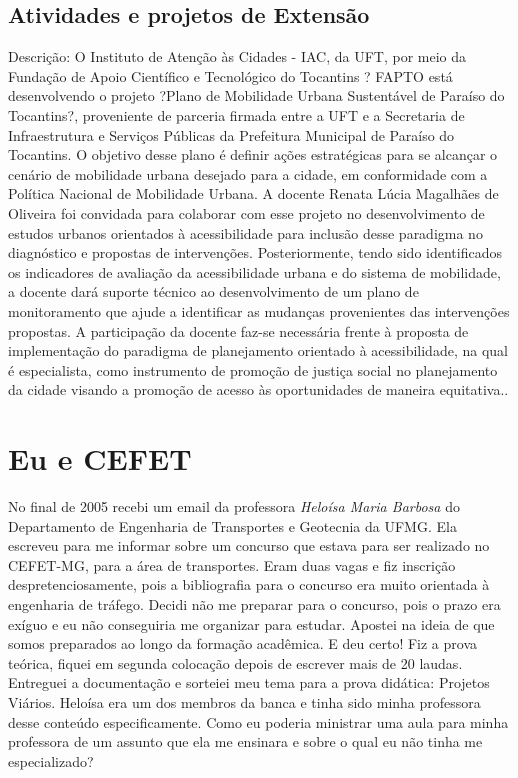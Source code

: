 \documentclass[
]{book}
\begin{document}
\hypertarget{atividades-e-projetos-de-extensuxe3o}{%
\section{Atividades e projetos de
Extensão}\label{atividades-e-projetos-de-extensuxe3o}}

Descrição: O Instituto de Atenção às Cidades - IAC, da UFT, por meio da
Fundação de Apoio Científico e Tecnológico do Tocantins ? FAPTO está
desenvolvendo o projeto ?Plano de Mobilidade Urbana Sustentável de
Paraíso do Tocantins?, proveniente de parceria firmada entre a UFT e a
Secretaria de Infraestrutura e Serviços Públicas da Prefeitura Municipal
de Paraíso do Tocantins. O objetivo desse plano é definir ações
estratégicas para se alcançar o cenário de mobilidade urbana desejado
para a cidade, em conformidade com a Política Nacional de Mobilidade
Urbana. A docente Renata Lúcia Magalhães de Oliveira foi convidada para
colaborar com esse projeto no desenvolvimento de estudos urbanos
orientados à acessibilidade para inclusão desse paradigma no diagnóstico
e propostas de intervenções. Posteriormente, tendo sido identificados os
indicadores de avaliação da acessibilidade urbana e do sistema de
mobilidade, a docente dará suporte técnico ao desenvolvimento de um
plano de monitoramento que ajude a identificar as mudanças provenientes
das intervenções propostas. A participação da docente faz-se necessária
frente à proposta de implementação do paradigma de planejamento
orientado à acessibilidade, na qual é especialista, como instrumento de
promoção de justiça social no planejamento da cidade visando a promoção
de acesso às oportunidades de maneira equitativa..

\hypertarget{eu-e-cefet}{%
\chapter{Eu e CEFET}\label{eu-e-cefet}}

No final de 2005 recebi um email da professora \emph{Heloísa Maria
Barbosa} do Departamento de Engenharia de Transportes e Geotecnia da
UFMG. Ela escreveu para me informar sobre um concurso que estava para
ser realizado no CEFET-MG, para a área de transportes. Eram duas vagas e
fiz inscrição despretenciosamente, pois a bibliografia para o concurso
era muito orientada à engenharia de tráfego. Decidi não me preparar para
o concurso, pois o prazo era exíguo e eu não conseguiria me organizar
para estudar. Apostei na ideia de que somos preparados ao longo da
formação acadêmica. E deu certo! Fiz a prova teórica, fiquei em segunda
colocação depois de escrever mais de 20 laudas. Entreguei a documentação
e sorteiei meu tema para a prova didática: Projetos Viários. Heloísa era
um dos membros da banca e tinha sido minha professora desse conteúdo
especificamente. Como eu poderia ministrar uma aula para minha
professora de um assunto que ela me ensinara e sobre o qual eu não tinha
me especializado?
\end{document}
